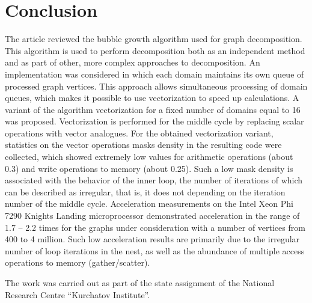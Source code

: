 \documentclass[
11pt,%
tightenlines,%
twoside,%
onecolumn,%
nofloats,%
nobibnotes,%
nofootinbib,%
superscriptaddress,%
noshowpacs,%
centertags]%
{revtex4}
\begin{document}
\section{Conclusion}

The article reviewed the bubble growth algorithm used for graph decomposition.
This algorithm is used to perform decomposition both as an independent method and as part of other, more complex approaches to decomposition.
An implementation was considered in which each domain maintains its own queue of processed graph vertices.
This approach allows simultaneous processing of domain queues, which makes it possible to use vectorization to speed up calculations.
A variant of the algorithm vectorization for a fixed number of domains equal to 16 was proposed.
Vectorization is performed for the middle cycle by replacing scalar operations with vector analogues.
For the obtained vectorization variant, statistics on the vector operations masks density in the resulting code were collected, which showed extremely low values for arithmetic operations (about 0.3) and write operations to memory (about 0.25).
Such a low mask density is associated with the behavior of the inner loop, the number of iterations of which can be described as irregular, that is, it does not depending on the iteration number of the middle cycle.
Acceleration measurements on the Intel Xeon Phi 7290 Knights Landing microprocessor demonstrated acceleration in the range of 1.7 -- 2.2 times for the graphs under consideration with a number of vertices from 400 to 4 million.
Such low acceleration results are primarily due to the irregular number of loop iterations in the nest, as well as the abundance of multiple access operations to memory (gather/scatter).

\begin{acknowledgments}
The work was carried out as part of the state assignment of the National Research Centre \textquotedblleft Kurchatov Institute\textquotedblright.
\end{acknowledgments}

%
%
\end{document}
